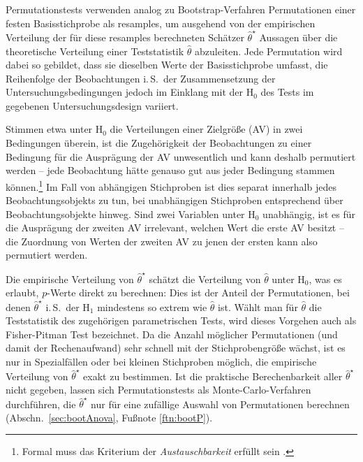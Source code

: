 Permutationstests \cite{Chihara2011,Good2004} verwenden analog zu Bootstrap-Verfahren Permutationen einer festen Basisstichprobe als resamples, um ausgehend von der empirischen Verteilung der für diese resamples berechneten Schätzer $\hat{\theta}^{\star}$ Aussagen über die theoretische Verteilung einer Teststatistik $\hat{\theta}$ abzuleiten. Jede Permutation wird dabei so gebildet, dass sie dieselben Werte der Basisstichprobe umfasst, die Reihenfolge der Beobachtungen i.\,S.\ der Zusammensetzung der Untersuchungsbedingungen jedoch im Einklang mit der $\text{H}_{0}$ des Tests im gegebenen Untersuchungsdesign variiert.

Stimmen etwa unter $\text{H}_{0}$ die Verteilungen einer Zielgröße (AV) in zwei Bedingungen überein, ist die Zugehörigkeit der Beobachtungen zu einer Bedingung für die Ausprägung der AV unwesentlich und kann deshalb permutiert werden -- jede Beobachtung hätte genauso gut aus jeder Bedingung stammen können.\footnote{Formal muss das Kriterium der \emph{Austauschbarkeit} erfüllt sein \cite{Good2004}.} Im Fall von abhängigen Stichproben ist dies separat innerhalb jedes Beobachtungsobjekts zu tun, bei unabhängigen Stichproben entsprechend über Beobachtungsobjekte hinweg. Sind zwei Variablen unter $\text{H}_{0}$ unabhängig, ist es für die Ausprägung der zweiten AV irrelevant, welchen Wert die erste AV besitzt -- die Zuordnung von Werten der zweiten AV zu jenen der ersten kann also permutiert werden.

Die empirische Verteilung von $\hat{\theta}^{\star}$ schätzt die Verteilung von $\hat{\theta}$ unter $\text{H}_{0}$, was es erlaubt, $p$-Werte direkt zu berechnen: Dies ist der Anteil der Permutationen, bei denen $\hat{\theta}^{\star}$ i.\,S.\ der $\text{H}_{1}$ mindestens so extrem wie $\hat{\theta}$ ist. Wählt man für $\hat{\theta}$ die Teststatistik des zugehörigen parametrischen Tests, wird dieses Vorgehen auch als Fisher-Pitman Test bezeichnet. Da die Anzahl möglicher Permutationen (und damit der Rechenaufwand) sehr schnell mit der Stichprobengröße wächst, ist es nur in Spezialfällen oder bei kleinen Stichproben möglich, die empirische Verteilung von $\hat{\theta}^{\star}$ exakt zu bestimmen. Ist die praktische Berechenbarkeit aller $\hat{\theta}^{\star}$ nicht gegeben, lassen sich Permutationstests als Monte-Carlo-Verfahren durchführen, die $\hat{\theta}^{\star}$ nur für eine zufällige Auswahl von Permutationen berechnen (Abschn.\ \ref{sec:bootAnova}, Fußnote \ref{ftn:bootP}).

